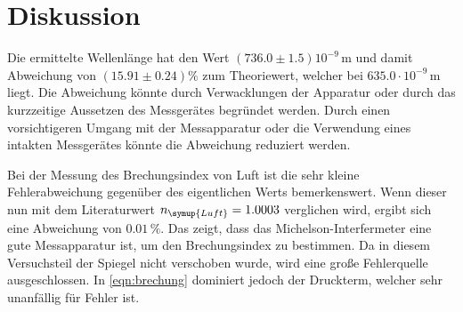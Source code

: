 \section{Diskussion}
\label{sec:Diskussion}

Die ermittelte Wellenlänge hat den Wert $(736.0 \pm 1.5)10^{-9}\, \unit{\meter}$ und damit Abweichung von $(15.91 \pm 0.24)\%$ zum Theoriewert, welcher bei $635.0\cdot 10^{-9}\, \unit{\meter}$ liegt.
Die Abweichung könnte durch Verwacklungen der Apparatur oder durch das kurzzeitige Aussetzen des Messgerätes begründet werden. 
Durch einen vorsichtigeren Umgang mit der Messapparatur oder die Verwendung eines intakten Messgerätes könnte die Abweichung reduziert werden.

Bei der Messung des Brechungsindex  von Luft ist die sehr kleine Fehlerabweichung gegenüber des eigentlichen Werts bemerkenswert. Wenn dieser nun 
mit dem Literaturwert $n_{\symup{Luft}} = 1.0003$ \cite{brechung} verglichen wird, ergibt sich eine Abweichung von $0.01\,\%$. Das zeigt, dass das Michelson-Interfermeter 
eine gute Messapparatur ist, um den Brechungsindex zu bestimmen. Da in diesem Versuchsteil der Spiegel nicht verschoben wurde, wird eine große Fehlerquelle 
ausgeschlossen. In \autoref{eqn:brechung} dominiert jedoch der Druckterm, welcher sehr unanfällig für Fehler ist.